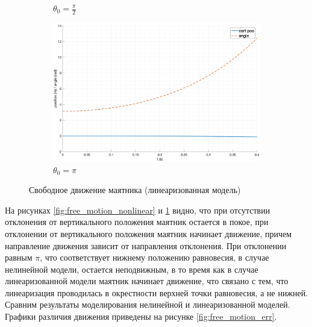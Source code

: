 \begin{figure}[ht!]
\begin{subfigure}[b]{0.45\textwidth}
        \caption{$\theta_0 = \frac{\pi}{2}$}
    \end{subfigure}
    \begin{subfigure}[b]{0.45\textwidth}
        \includegraphics[width=\textwidth]{media/plots/free_motion/lin_6.png}
        \caption{$\theta_0 = \pi$}
    \end{subfigure}
    \caption{Свободное движение маятника (линеаризованная модель)}
    \label{fig:free_motion_linear}
\end{figure}

На рисунках \ref{fig:free_motion_nonlinear} и \ref{fig:free_motion_linear} видно, что при 
отсутствии отклонения от вертикального положения маятник остается в покое, 
при отклонении от вертикального положения маятник начинает движение, причем 
направление движения зависит от направления отклонения. При отклонении 
равным $\pi$, что соответствует нижнему положению равновесия, в случае нелинейной 
модели, остается неподвижным, в то время как в случае линеаризованной модели 
маятник начинает движение, что связано с тем, что линеаризация проводилась в окрестности
верхней точки равновесия, а не нижней. Сравним результаты моделирования
нелинейной и линеаризованной моделей. Графики различия движения приведены на
рисунке \ref{fig:free_motion_err}. 

